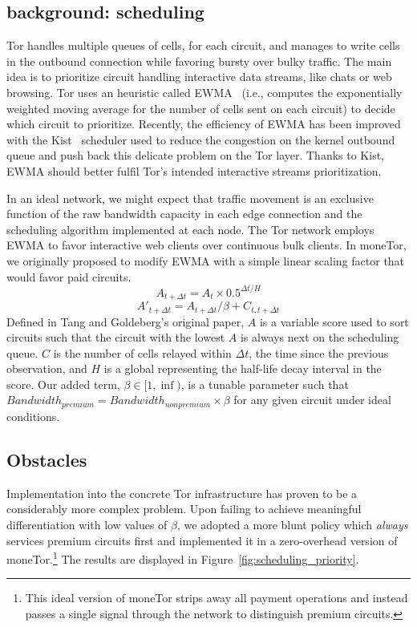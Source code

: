 \label{sec:scheduling}
\subsection{background: scheduling}

Tor handles multiple queues of cells, for each circuit, and manages to write
cells in the outbound connection while favoring bursty over bulky traffic. The
main idea is to prioritize circuit handling interactive data streams, like chats
or web browsing. Tor uses an heuristic called EWMA~\cite{tang2010improved}
(i.e., computes the exponentially weighted moving average for the number of
cells sent on each circuit) to decide which circuit to prioritize. Recently, the
efficiency of EWMA has been improved with the Kist~\cite{jansen2014never}
scheduler used to reduce the congestion on the kernel outbound queue and push
back this delicate problem on the Tor layer. Thanks to Kist, EWMA should better
fulfil Tor's intended interactive streams prioritization. %

In an ideal network, we might expect that traffic movement is an exclusive
function of the raw bandwidth capacity in each edge connection and the
scheduling algorithm implemented at each node.
The Tor network
employs EWMA to favor interactive web clients over
continuous bulk clients. In moneTor, we originally proposed to modify EWMA with a simple linear
scaling factor that would favor paid circuits.
\begin{equation}
  A_{t + \Delta t} = A_t \times 0.5^{\Delta t/H}
\end{equation}
\begin{equation}
  A'_{t + \Delta t} = A_{t + \Delta t} / \beta + C_{t, t + \Delta t}
\end{equation}
Defined in Tang and Goldeberg's original paper, $A$ is a variable score used to
sort circuits such that the circuit with the lowest $A$ is always next on the
scheduling queue. $C$ is the number of cells relayed within $\Delta t$, the time
since the previous observation, and $H$ is a global representing the half-life
decay interval in the score. Our added term, $\beta \in [1, \inf)$, is a tunable
parameter such that $Bandwidth_{premium} = Bandwidth_{nonpremium} \times \beta$
for any given circuit under ideal conditions.

\subsection{Obstacles}

Implementation into the concrete Tor infrastructure has proven to be a
considerably more complex problem. Upon failing to achieve meaningful
differentiation with low values of $\beta$, we adopted a more blunt policy which
\emph{always} services premium circuits first and implemented it in a
zero-overhead version of moneTor.\footnote{This ideal version of moneTor strips
  away all payment operations and instead passes a single signal through the
  network to distinguish premium circuits.} The results are displayed in
Figure~\ref{fig:scheduling_priority}.


